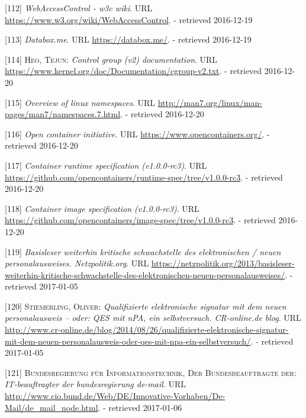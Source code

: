 \documentclass[12pt,english,a4paper,titlepage,cleardoublepage=empty,dottedtoc]{report}
\begin{document}
\hypertarget{ref-web_2016_wiki_webaccesscontrol}{}
{[}112{]} \emph{WebAccessControl - w3c wiki}. URL
\url{https://www.w3.org/wiki/WebAccessControl}. - retrieved 2016-12-19

\hypertarget{ref-web_2016_demo_databox}{}
{[}113{]} \emph{Databox.me}. URL \url{https://databox.me/}. - retrieved
2016-12-19

\hypertarget{ref-web_2015_cgroup-doc}{}
{[}114{]} \textsc{Heo, Tejun}: \emph{Control group (v2) documentation}.
URL \url{https://www.kernel.org/doc/Documentation/cgroup-v2.txt}. -
retrieved 2016-12-20

\hypertarget{ref-web_2016_kernel-namespace}{}
{[}115{]} \emph{Overview of linux namespaces}. URL
\url{http://man7.org/linux/man-pages/man7/namespaces.7.html}. -
retrieved 2016-12-20

\hypertarget{ref-web_2016_open-container-initiative}{}
{[}116{]} \emph{Open container initiative}. URL
\url{https://www.opencontainers.org/}. - retrieved 2016-12-20

\hypertarget{ref-web_oci-spec_runtime}{}
{[}117{]} \emph{Container runtime specification (v1.0.0-rc3)}. URL
\url{https://github.com/opencontainers/runtime-spec/tree/v1.0.0-rc3}. -
retrieved 2016-12-20

\hypertarget{ref-web_oci-spec_image}{}
{[}118{]} \emph{Container image specification (v1.0.0-rc3)}. URL
\url{https://github.com/opencontainers/image-spec/tree/v1.0.0-rc3}. -
retrieved 2016-12-20

\hypertarget{ref-web_2013_npa-sicherheitsdefizit}{}
{[}119{]} \emph{Basisleser weiterhin kritische schwachstelle des
elektronischen / neuen personalausweises. Netzpolitik.org}. URL
\url{https://netzpolitik.org/2013/basisleser-weiterhin-kritische-schwachstelle-des-elektronischen-neuen-personalausweises/}.
- retrieved 2017-01-05

\hypertarget{ref-web_2014_test-qes-support-in-npa}{}
{[}120{]} \textsc{Stiemerling, Oliver}: \emph{Qualifizierte
elektronische signatur mit dem neuen personalausweis -- oder: QES mit
nPA, ein selbstversuch. CR-online.de blog}. URL
\url{http://www.cr-online.de/blog/2014/08/26/qualifizierte-elektronische-signatur-mit-dem-neuen-personalausweis-oder-qes-mit-npa-ein-selbstversuch/}.
- retrieved 2017-01-05

\hypertarget{ref-web_2017_about-de-mail}{}
{[}121{]} \textsc{Bundesregierung für Informationstechnik, Der
Bundesbeauftragte der}: \emph{IT-beauftragter der bundesregierung
de-mail}. URL
\url{http://www.cio.bund.de/Web/DE/Innovative-Vorhaben/De-Mail/de_mail_node.html}.
- retrieved 2017-01-06
\end{document}
